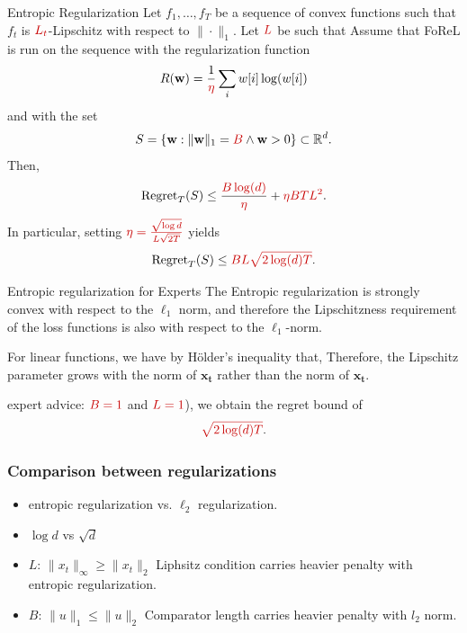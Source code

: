 \documentclass[handout]{beamer}
\newcommand{\redmath}[1]{\textcolor{mathred}{#1}}
\begin{document}
\begin{small}
\begin{frame}{Entropic Regularization}
    Let \( f_1, \dots, f_T \) be a sequence of convex functions such that 
    \( f_t \) is \( \redmath{L_t} \)-Lipschitz with respect to \( \|\cdot\|_1 \). 
    Let \( \redmath{L} \) be such that 
    \R{$
    \frac{1}{T} \sum_{t=1}^{T} \redmath{L_t^2} \leq \redmath{L^2}.
    $}
    Assume that FoReL is run on the sequence with the regularization function 
    \[
    R(\mathbf{w}) = \frac{1}{\redmath{\eta}} \sum_{i} w[i] \log(w[i])
    \]
    and with the set 
    \[
    S = \{\mathbf{w} : \|\mathbf{w}\|_1 = \redmath{B} \wedge \mathbf{w} > 0 \} \subset \mathbb{R}^d.
    \]
    Then, 
    \[
    \text{Regret}_T(S) \leq \frac{\redmath{B \log(d)}}{\redmath{\eta}} + \redmath{\eta BTL^2}.
    \]
    In particular, setting \( \redmath{\eta = \frac{\sqrt{\log d}}{L\sqrt{2T}}} \) yields
    \[
    \text{Regret}_T(S) \leq \redmath{BL\sqrt{2\log(d)T}}.
    \]
  \end{frame}


\begin{frame}{Entropic regularization for Experts}
    The Entropic regularization is strongly convex with respect to the \( \ell_1 \) norm, and therefore the Lipschitzness requirement of the loss functions is also with respect to the \( \ell_1 \)-norm. 
    
    For linear functions, 
    \R{\[
    f_t(\mathbf{w}) = \langle \mathbf{w}, \mathbf{x_t} \rangle,
    \]}
    we have by Hölder’s inequality that,
    \R{\[
    | f_t(\mathbf{w}) - f_t(\mathbf{u}) | = | \langle \mathbf{w} - \mathbf{u}, \mathbf{x_t} \rangle | 
    \leq \| \mathbf{w} - \mathbf{u} \|_1 \|\mathbf{x_t} \|_\infty.
    \]}
    Therefore, the Lipschitz parameter grows with the \R{\( \ell_\infty \)} norm of \( \mathbf{x_t} \) rather than the  norm of \( \mathbf{x_t} \). 
    
    expert advice: \( \redmath{B = 1} \) and \( \redmath{L = 1} \)), we obtain the regret bound of 
    \[
    \redmath{\sqrt{2\log(d)T}}.
    \]
\end{frame}

\begin{frame}
  \frametitle{Comparison between regularizations}
  \begin{itemize}
  \item entropic regularization vs. $\ell_2$ regularization.
  \item $\log {d}$ vs $\sqrt{d}$
  \item $L$: $\|x_t\|_{\infty} \geq \|x_t\|_{2}$ Liphsitz condition carries heavier penalty with entropic regularization.
  \item $B$: $\|u\|_1 \leq \|u\|_{2}$ Comparator length carries heavier penalty with $l_2$ norm.
  \end{itemize}
\end{frame}


\end{small}
\end{document}
